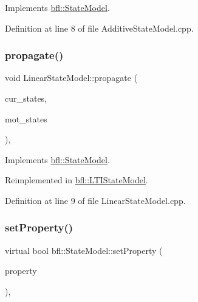 Implements \mbox{\hyperlink{classbfl_1_1StateModel_a34037bc30bc07667b76b5a719a65ab82}{bfl\+::\+State\+Model}}.



Definition at line 8 of file Additive\+State\+Model.\+cpp.

\mbox{\label{classbfl_1_1LinearStateModel_a7823383ddc1ed709b9399c712997f512}} 
\subsubsection{\texorpdfstring{propagate()}{propagate()}}
{\footnotesize\ttfamily void Linear\+State\+Model\+::propagate (\begin{DoxyParamCaption}\item[{const Eigen\+::\+Ref$<$ const Eigen\+::\+Matrix\+Xd $>$ \&}]{cur\+\_\+states,  }\item[{Eigen\+::\+Ref$<$ Eigen\+::\+Matrix\+Xd $>$}]{mot\+\_\+states }\end{DoxyParamCaption})\hspace{0.3cm}{\ttfamily [override]}, {\ttfamily [virtual]}}



Implements \mbox{\hyperlink{classbfl_1_1StateModel_a39cd8c8c5adbd623884583b4a7a7415c}{bfl\+::\+State\+Model}}.



Reimplemented in \mbox{\hyperlink{classbfl_1_1LTIStateModel_a0a736ef66903c2e598f0b86892a716aa}{bfl\+::\+L\+T\+I\+State\+Model}}.



Definition at line 9 of file Linear\+State\+Model.\+cpp.

\mbox{\label{classbfl_1_1StateModel_ac86dcdad8f0bbfab39a23e592779feaa}} 
\subsubsection{\texorpdfstring{set\+Property()}{setProperty()}}
{\footnotesize\ttfamily virtual bool bfl\+::\+State\+Model\+::set\+Property (\begin{DoxyParamCaption}\item[{const std\+::string \&}]{property }\end{DoxyParamCaption})\hspace{0.3cm}{\ttfamily [pure virtual]}, {\ttfamily [inherited]}}




